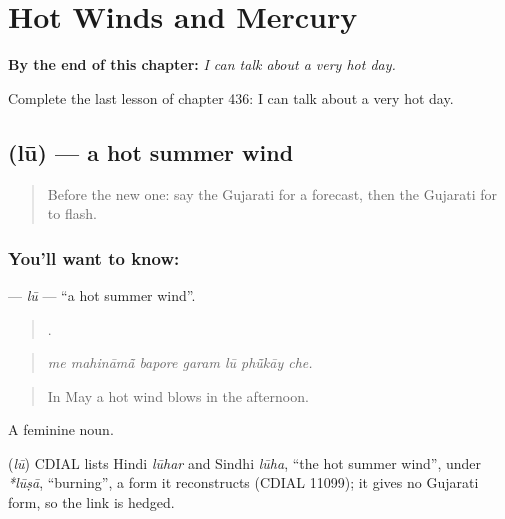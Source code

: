
\chapter{Hot Winds and Mercury}
\label{ch:gu-hot-winds-and-mercury}

\begin{chapteropening}
\textbf{By the end of this chapter:} \emph{I can talk about a very hot day.}

Complete the last lesson of chapter 436: I can talk about a very hot day.
\end{chapteropening}

\section[\texorpdfstring{\gu{લૂ} (lū)}{લૂ (lū)}]{ (lū) — a hot summer wind}

\label{lesson:GU-C436-lu}



\begin{quote}
Before the new one: say the Gujarati for a forecast, then the Gujarati for to flash.
\end{quote}

\subsection*{You'll want to know: }
\textbf{} — \emph{lū} — \textquotedblleft{}a hot summer wind\textquotedblright{}.

\begin{quote}
      .
\end{quote}

\begin{quote}
\emph{me mahināmā̃ bapore garam lū phū̃kāy che.}
\end{quote}

\begin{quote}
In May a hot wind blows in the afternoon.
\end{quote}

A feminine noun.

\begin{cousinweb}
\textbf{} (\emph{lū}) CDIAL lists Hindi \emph{lūhar} and Sindhi \emph{lūha}, \textquotedblleft{}the hot summer wind\textquotedblright{}, under \emph{*lūṣā}, \textquotedblleft{}burning\textquotedblright{}, a form it reconstructs (CDIAL 11099); it gives no Gujarati form, so the link is hedged.
\end{cousinweb}

